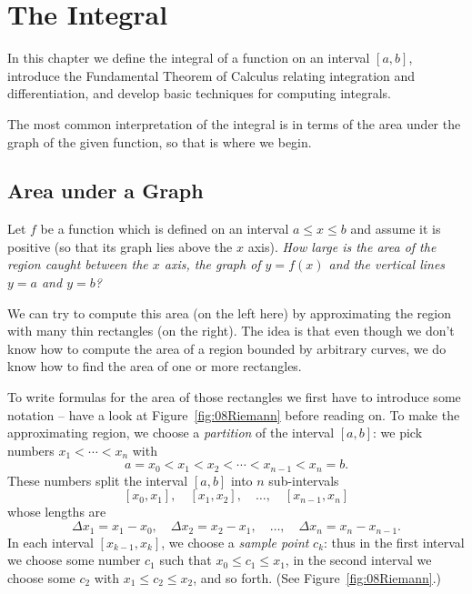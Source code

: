 


\chapter{The Integral}
In this chapter we define the integral of a function on an interval $[a,b]$,
introduce the Fundamental Theorem of Calculus relating integration and
differentiation, and develop basic techniques for computing integrals.

The most common interpretation of the integral is in terms of the area under the
graph of the given function, so that is where we begin.


\section{Area under a Graph} %
Let $f$ be a function which is defined on an interval $a\leq x\leq
b$ and assume it is positive (so that its graph lies above
the $x$ axis). \textit{How large is the area of the region caught
  between the $x$ axis, the graph of $y=f(x)$ and the vertical lines
  $y=a$ and $y=b$?}
\begin{figure}[h]
    \parbox{0.45\textwidth}{}
    \parbox{0.45\textwidth}{}
\end{figure}
We can try to compute this area (on the left here) by approximating
the region with many thin rectangles (on the right).  The idea is that
even though we don't know how to compute the area of a region bounded
by arbitrary curves, we do know how to find the area of one or more
rectangles.

To write formulas for the area of those rectangles we first have to
introduce some notation -- have a look at Figure~\ref{fig:08Riemann}
before reading on.  To make the approximating region, we choose a
\emph{partition} of the interval $[a, b]$: we pick numbers
$x_1<\cdots<x_n$ with
\[
a=x_0 < x_1 < x_2 < \cdots < x_{n-1}< x_n = b.
\]
These numbers split the interval $[a, b]$ into $n$ sub-intervals
\[
[x_0, x_1], \quad [x_1, x_2],\quad \ldots,\quad [x_{n-1}, x_n]
\]
whose lengths are
\[
\Delta x_1 = x_1-x_0, \quad \Delta x_2 = x_2 - x_1, \quad\ldots, \quad
\Delta x_n = x_n-x_{n-1}.
\]
In each interval $[x_{k-1},x_k]$, we choose a \emph{sample point} $c_k$: thus in
the first interval we choose some number $c_1$ such that $x_0\leq c_1\leq x_1$,
in the second interval we choose some $c_2$ with $x_1\leq c_2\leq x_2$, and so
forth. (See Figure~\ref{fig:08Riemann}.)

